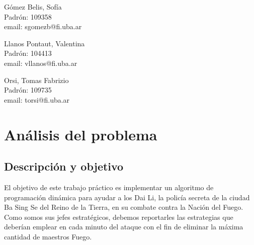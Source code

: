 \documentclass{article}
\begin{document}
\begin{titlepage}
\begin{center}
    {\begin{minipage}[t]{.32\textwidth}
        \begin{center}
          Gómez Belis, Sofía\\
          {\small{Padrón: 109358}}\\
          {\small{email: sgomezb@fi.uba.ar}}
        \end{center}
          \end{minipage}
          \begin{minipage}[t]{.32\textwidth}
        \begin{center}
          Llanos Pontaut, Valentina\\
          {\small{Padrón: 104413}}\\
          {\small{email: vllanos@fi.uba.ar}}\\
        \end{center}
      \end{minipage}
      \begin{minipage}[t]{.32\textwidth}
        \begin{center}
          Orsi, Tomas Fabrizio\\
          {\small{Padrón: 109735}}\\
          {\small{email: torsi@fi.uba.ar}}
        \end{center}
      \end{minipage}}

  \end{center}
\end{titlepage}

\renewcommand*\contentsname{Indice}
\tableofcontents
\pagebreak

\section{Análisis del problema}
\subsection{Descripción y objetivo}

El objetivo de este trabajo práctico es implementar un algoritmo de programación dinámica para ayudar a los Dai Li, la policía secreta de la ciudad Ba Sing Se del Reino de la Tierra, en su combate contra la Nación del Fuego. Como somos sus jefes estratégicos, debemos reportarles las estrategias que deberían emplear en cada minuto del ataque con el fin de eliminar la máxima cantidad de maestros Fuego.
\end{document}
